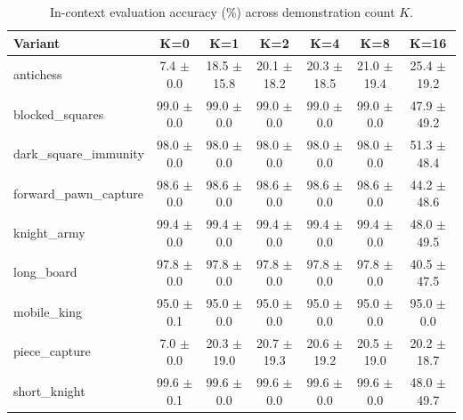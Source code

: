 \begin{table}[ht]
\centering
\begin{tabular}{lcccccc}
\toprule
Variant & K=0 & K=1 & K=2 & K=4 & K=8 & K=16 \\
\midrule
antichess & 7.4 $\pm$ 0.0 & 18.5 $\pm$ 15.8 & 20.1 $\pm$ 18.2 & 20.3 $\pm$ 18.5 & 21.0 $\pm$ 19.4 & 25.4 $\pm$ 19.2 \\
blocked\_squares & 99.0 $\pm$ 0.0 & 99.0 $\pm$ 0.0 & 99.0 $\pm$ 0.0 & 99.0 $\pm$ 0.0 & 99.0 $\pm$ 0.0 & 47.9 $\pm$ 49.2 \\
dark\_square\_immunity & 98.0 $\pm$ 0.0 & 98.0 $\pm$ 0.0 & 98.0 $\pm$ 0.0 & 98.0 $\pm$ 0.0 & 98.0 $\pm$ 0.0 & 51.3 $\pm$ 48.4 \\
forward\_pawn\_capture & 98.6 $\pm$ 0.0 & 98.6 $\pm$ 0.0 & 98.6 $\pm$ 0.0 & 98.6 $\pm$ 0.0 & 98.6 $\pm$ 0.0 & 44.2 $\pm$ 48.6 \\
knight\_army & 99.4 $\pm$ 0.0 & 99.4 $\pm$ 0.0 & 99.4 $\pm$ 0.0 & 99.4 $\pm$ 0.0 & 99.4 $\pm$ 0.0 & 48.0 $\pm$ 49.5 \\
long\_board & 97.8 $\pm$ 0.0 & 97.8 $\pm$ 0.0 & 97.8 $\pm$ 0.0 & 97.8 $\pm$ 0.0 & 97.8 $\pm$ 0.0 & 40.5 $\pm$ 47.5 \\
mobile\_king & 95.0 $\pm$ 0.1 & 95.0 $\pm$ 0.0 & 95.0 $\pm$ 0.0 & 95.0 $\pm$ 0.0 & 95.0 $\pm$ 0.0 & 95.0 $\pm$ 0.0 \\
piece\_capture & 7.0 $\pm$ 0.0 & 20.3 $\pm$ 19.0 & 20.7 $\pm$ 19.3 & 20.6 $\pm$ 19.2 & 20.5 $\pm$ 19.0 & 20.2 $\pm$ 18.7 \\
short\_knight & 99.6 $\pm$ 0.1 & 99.6 $\pm$ 0.0 & 99.6 $\pm$ 0.0 & 99.6 $\pm$ 0.0 & 99.6 $\pm$ 0.0 & 48.0 $\pm$ 49.7 \\
\bottomrule
\end{tabular}
\caption{In-context evaluation accuracy (\%) across demonstration count $K$.}
\label{tab:icl_results}
\end{table}